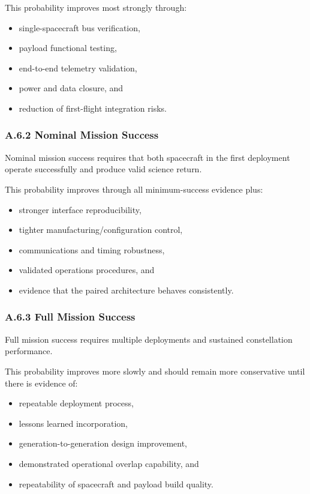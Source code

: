 \documentclass[11pt]{article}
\begin{document}
This probability improves most strongly through:

\begin{itemize}
    \item single-spacecraft bus verification,
    \item payload functional testing,
    \item end-to-end telemetry validation,
    \item power and data closure, and
    \item reduction of first-flight integration risks.
\end{itemize}

\subsubsection*{A.6.2 Nominal Mission Success}

Nominal mission success requires that both spacecraft in the first deployment operate successfully and
produce valid science return.

This probability improves through all minimum-success evidence plus:

\begin{itemize}
    \item stronger interface reproducibility,
    \item tighter manufacturing/configuration control,
    \item communications and timing robustness,
    \item validated operations procedures, and
    \item evidence that the paired architecture behaves consistently.
\end{itemize}

\subsubsection*{A.6.3 Full Mission Success}

Full mission success requires multiple deployments and sustained constellation performance.

This probability improves more slowly and should remain more conservative until there is evidence of:

\begin{itemize}
    \item repeatable deployment process,
    \item lessons learned incorporation,
    \item generation-to-generation design improvement,
    \item demonstrated operational overlap capability, and
    \item repeatability of spacecraft and payload build quality.
\end{itemize}
\end{document}
